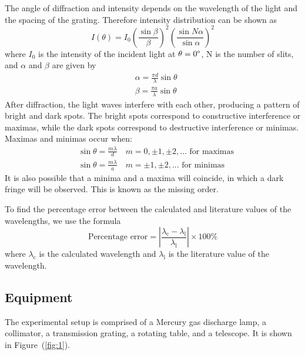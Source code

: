 \documentclass[10pt]{article}
\begin{document}
The angle of diffraction and intensity depends on the wavelength of the light and the spacing of the grating. Therefore intensity distribution can be shown as
\begin{equation}
  I(\theta) = I_0 \left( \frac{\sin \beta}{\beta} \right)^2 \left( \frac{\sin N \alpha}{\sin \alpha} \right)^2
\end{equation}
where $I_0$ is the intensity of the incident light at $\theta = 0\degree$, N is the number of slits, and $\alpha$ and $\beta$ are given by
\begin{align}
  &\alpha = \frac{\pi d}{\lambda} \sin \theta \\
  &\beta = \frac{\pi a}{\lambda} \sin \theta
\end{align}
After diffraction, the light waves interfere with each other, producing a pattern of bright and dark spots. The bright spots correspond to constructive interference or maximas, while the dark spots correspond to destructive interference or minimas. Maximas and minimas occur when:
\begin{align}
  &\sin \theta = \frac{m \lambda}{d} \quad m = 0, \pm 1, \pm 2, ... \text{ for maximas} \\
  &\sin \theta = \frac{m \lambda}{a} \quad m = \pm 1, \pm 2, ... \text{ for minimas}
  \label{eq:maximas-minimas}
\end{align}
It is also possible that a minima and a maxima will coincide, in which a dark fringe will be observed. This is known as the missing order.

To find the percentage error between the calculated and literature values of the wavelengths, we use the formula
\begin{equation}
  \text{Percentage error} = \left| \frac{\lambda_{\text{c}} - \lambda_{\text{l}}}{\lambda_{\text{l}}} \right| \times 100 \%
  \label{eq:percentage-error}
\end{equation}
where $\lambda_{\text{c}}$ is the calculated wavelength and $\lambda_{\text{l}}$ is the literature value of the wavelength.

\subsection*{Equipment}

The experimental setup is comprised of a Mercury gas discharge lamp, a collimator, a transmission grating, a rotating table, and a telescope. It is shown in Figure~(\ref{fig:1}). 
\end{document}
